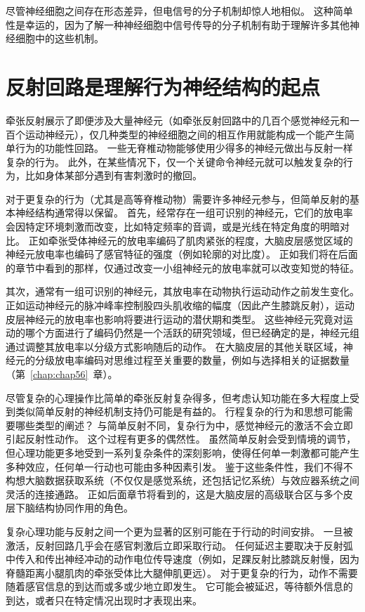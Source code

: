 尽管神经细胞之间存在形态差异，但电信号的分子机制却惊人地相似。 
这种简单性是幸运的，因为了解一种神经细胞中信号传导的分子机制有助于理解许多其他神经细胞中的这些机制。


\section{反射回路是理解行为神经结构的起点}
牵张反射展示了即便涉及大量神经元（如牵张反射回路中的几百个感觉神经元和一百个运动神经元），仅几种类型的神经细胞之间的相互作用就能构成一个能产生简单行为的功能性回路。
一些无脊椎动物能够使用少得多的神经元做出与反射一样复杂的行为。 
此外，在某些情况下，仅一个关键命令神经元就可以触发复杂的行为，比如身体某部分遇到有害刺激时的撤回。


对于更复杂的行为（尤其是高等脊椎动物）需要许多神经元参与，但简单反射的基本神经结构通常得以保留。
首先，经常存在一组可识别的神经元，它们的放电率会因特定环境刺激而改变，比如特定频率的音调，或是光线在特定角度的明暗对比。
正如牵张受体神经元的放电率编码了肌肉紧张的程度，大脑皮层感觉区域的神经元放电率也编码了感官特征的强度（例如轮廓的对比度）。 
正如我们将在后面的章节中看到的那样，仅通过改变一小组神经元的放电率就可以改变知觉的特征。


其次，通常有一组可识别的神经元，其放电率在动物执行运动动作之前发生变化。 
正如运动神经元的脉冲峰率控制股四头肌收缩的幅度（因此产生膝跳反射），运动皮层神经元的放电率也影响将要进行运动的潜伏期和类型。
这些神经元究竟对运动的哪个方面进行了编码仍然是一个活跃的研究领域，但已经确定的是，神经元组通过调整其放电率以分级方式影响随后的动作。 
在大脑皮层的其他关联区域，神经元的分级放电率编码对思维过程至关重要的数量，例如与选择相关的证据数量（第~\ref{chap:chap56}~章）。


尽管复杂的心理操作比简单的牵张反射复杂得多，但考虑认知功能在多大程度上受到类似简单反射的神经机制支持仍可能是有益的。 
行程复杂的行为和思想可能需要哪些类型的阐述？
与简单反射不同，复杂行为中，感觉神经元的激活不会立即引起反射性动作。
这个过程有更多的偶然性。 
虽然简单反射会受到情境的调节，但心理功能更多地受到一系列复杂条件的深刻影响，使得任何单一刺激都可能产生多种效应，任何单一行动也可能由多种因素引发。 
鉴于这些条件性，我们不得不构想大脑数据获取系统（不仅仅是感觉系统，还包括记忆系统）与效应器系统之间灵活的连接通路。
正如后面章节将看到的，这是大脑皮层的高级联合区与多个皮层下脑结构协同作用的角色。


复杂心理功能与反射之间一个更为显著的区别可能在于行动的时间安排。 
一旦被激活，反射回路几乎会在感官刺激后立即采取行动。 
任何延迟主要取决于反射弧中传入和传出神经冲动的动作电位传导速度（例如，足踝反射比膝跳反射慢，因为脊髓距离小腿肌肉的牵张受体比大腿伸肌更远）。
对于更复杂的行为，动作不需要随着感官信息的到达而或多或少地立即发生。 
它可能会被延迟，等待额外信息的到达，或者只在特定情况出现时才表现出来。


